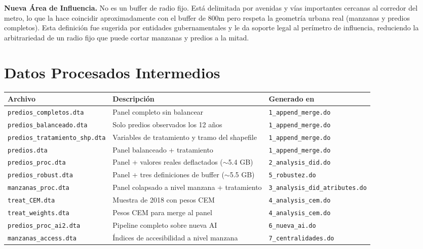 \documentclass[12pt, a4paper]{article}
\begin{document}
\begin{notebox}
\textbf{Nueva Área de Influencia.} No es un buffer de radio fijo. Está delimitada por avenidas y vías importantes cercanas al corredor del metro, lo que la hace coincidir aproximadamente con el buffer de 800m pero respeta la geometría urbana real (manzanas y predios completos). Esta definición fue sugerida por entidades gubernamentales y le da soporte legal al perímetro de influencia, reduciendo la arbitrariedad de un radio fijo que puede cortar manzanas y predios a la mitad.
\end{notebox}

\section{Datos Procesados Intermedios}

\begin{longtable}{@{}L{4.5cm} L{6cm} L{4cm}@{}}
\toprule
\textbf{Archivo} & \textbf{Descripción} & \textbf{Generado en} \\
\midrule
\endhead
\texttt{predios\_completos.dta} & Panel completo sin balancear & \texttt{1\_append\_merge.do} \\
\texttt{predios\_balanceado.dta} & Solo predios observados los 12 años & \texttt{1\_append\_merge.do} \\
\texttt{predios\_tratamiento\_shp.dta} & Variables de tratamiento y tramo del shapefile & \texttt{1\_append\_merge.do} \\
\texttt{predios.dta} & Panel balanceado + tratamiento & \texttt{1\_append\_merge.do} \\
\texttt{predios\_proc.dta} & Panel + valores reales deflactados ($\sim$5.4 GB) & \texttt{2\_analysis\_did.do} \\
\texttt{predios\_robust.dta} & Panel + tres definiciones de buffer ($\sim$5.5 GB) & \texttt{5\_robustez.do} \\
\texttt{manzanas\_proc.dta} & Panel colapsado a nivel manzana + tratamiento & \texttt{3\_analysis\_did\_atributes.do} \\
\texttt{treat\_CEM.dta} & Muestra de 2018 con pesos CEM & \texttt{4\_analysis\_cem.do} \\
\texttt{treat\_weights.dta} & Pesos CEM para merge al panel & \texttt{4\_analysis\_cem.do} \\
\texttt{predios\_proc\_ai2.dta} & Pipeline completo sobre nueva AI & \texttt{6\_nueva\_ai.do} \\
\texttt{manzanas\_access.dta} & Índices de accesibilidad a nivel manzana & \texttt{7\_centralidades.do} \\
\bottomrule
\end{longtable}
\end{document}
